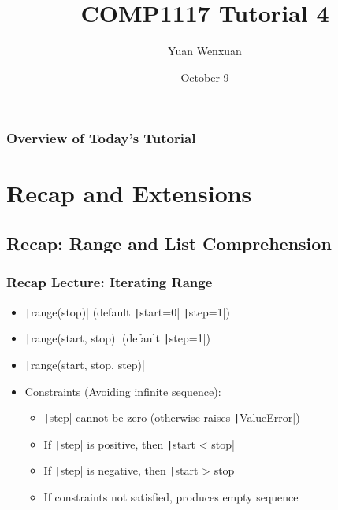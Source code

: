 \documentclass{beamer}
\title{COMP1117 Tutorial 4}
\author{Yuan Wenxuan}
\date{October 9}
\begin{document}
\frame{\titlepage}

\begin{frame}
    \frametitle{Overview of Today's Tutorial}
    \tableofcontents
\end{frame}

\section{Recap and Extensions}
\subsection{Recap: Range and List Comprehension}

\begin{frame}
    \frametitle{Recap Lecture: Iterating Range}
    \begin{itemize}
        \item \texttt|range(stop)| (default \texttt|start=0| \texttt|step=1|)
        \item \texttt|range(start, stop)| (default \texttt|step=1|)
        \item \texttt|range(start, stop, step)|
        \item Constraints (Avoiding infinite sequence):
              \begin{itemize}
                  \item \texttt|step| cannot be zero (otherwise raises \texttt|ValueError|)
                  \item If \texttt|step| is positive, then \texttt|start < stop|
                  \item If \texttt|step| is negative, then \texttt|start > stop|
                  \item If constraints not satisfied, produces empty sequence
              \end{itemize}
    \end{itemize}
\end{frame}
\end{document}
